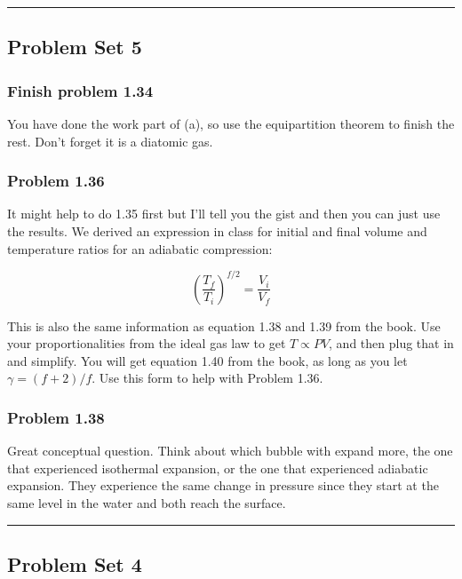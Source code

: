 \documentclass[11pt]{article}
\begin{document}
\begin{center}\rule{0.5\linewidth}{0.5pt}\end{center}

    \subsection{Problem Set 5}\label{problem-set-5}

\subsubsection{Finish problem 1.34}\label{finish-problem-1.34}

You have done the work part of (a), so use the equipartition theorem to
finish the rest. Don't forget it is a diatomic gas.

\subsubsection{Problem 1.36}\label{problem-1.36}

It might help to do 1.35 first but I'll tell you the gist and then you
can just use the results. We derived an expression in class for initial
and final volume and temperature ratios for an adiabatic compression:

\[ \left(\frac{T_f}{T_i}\right)^{f/2}=\frac{V_i}{V_f}\]

This is also the same information as equation 1.38 and 1.39 from the
book. Use your proportionalities from the ideal gas law to get
\(T\propto PV\), and then plug that in and simplify. You will get
equation 1.40 from the book, as long as you let \(\gamma = (f+2)/f\).
Use this form to help with Problem 1.36.

\subsubsection{Problem 1.38}\label{problem-1.38}

Great conceptual question. Think about which bubble with expand more,
the one that experienced isothermal expansion, or the one that
experienced adiabatic expansion. They experience the same change in
pressure since they start at the same level in the water and both reach
the surface.

\begin{center}\rule{0.5\linewidth}{0.5pt}\end{center}

    \subsection{Problem Set 4}\label{problem-set-4}
\end{document}
